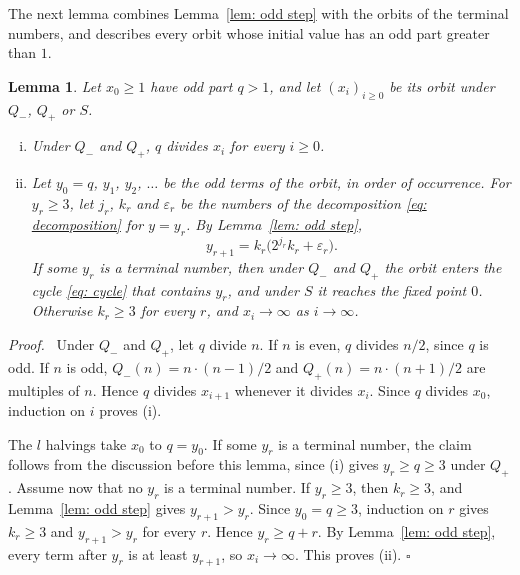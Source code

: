 \documentclass{article}
\newtheorem{lemma}{Lemma}
\newenvironment{proof}[1][Proof]{\par\medskip\noindent\textit{#1.}\ }{\hfill$\square$\par\medskip}
\newcommand{\Ge}{\geqslant}
\begin{document}
The next lemma combines Lemma~\ref{lem: odd step} with the orbits of the terminal numbers, and describes every orbit whose initial value has an odd part greater than $1$.

\begin{lemma}
\label{lem: orbit}
    Let $x_0 \Ge 1$ have odd part $q > 1$, and let $(x_i)_{i \Ge 0}$ be its orbit under $Q_-$, $Q_+$ or $S$.
    \begin{enumerate}[(i)]
        \setlength{\itemsep}{0pt}
        \item Under $Q_-$ and $Q_+$, $q$ divides $x_i$ for every $i \Ge 0$.
        \item Let $y_0 = q$, $y_1$, $y_2$, $\dots$ be the odd terms of the orbit, in order of occurrence. For $y_r \Ge 3$, let $j_r$, $k_r$ and $\varepsilon_r$ be the numbers of the decomposition \eqref{eq: decomposition} for $y = y_r$. By Lemma~\ref{lem: odd step},
        \begin{equation}
            y_{r+1} = k_r \bigl( 2^{j_r} k_r + \varepsilon_r \bigr) .
            \label{eq: odd terms}
        \end{equation}
        If some $y_r$ is a terminal number, then under $Q_-$ and $Q_+$ the orbit enters the cycle \eqref{eq: cycle} that contains $y_r$, and under $S$ it reaches the fixed point $0$. Otherwise $k_r \Ge 3$ for every $r$, and $x_i \to \infty$ as $i \to \infty$.
    \end{enumerate}
\end{lemma}

\begin{proof}
    Under $Q_-$ and $Q_+$, let $q$ divide $n$. If $n$ is even, $q$ divides $n/2$, since $q$ is odd. If $n$ is odd, $Q_-(n) = n \cdot (n - 1)/2$ and $Q_+(n) = n \cdot (n + 1)/2$ are multiples of $n$. Hence $q$ divides $x_{i+1}$ whenever it divides $x_i$. Since $q$ divides $x_0$, induction on $i$ proves (i).

    The $l$ halvings take $x_0$ to $q = y_0$. If some $y_r$ is a terminal number, the claim follows from the discussion before this lemma, since (i) gives $y_r \Ge q \Ge 3$ under $Q_+$. Assume now that no $y_r$ is a terminal number. If $y_r \Ge 3$, then $k_r \Ge 3$, and Lemma~\ref{lem: odd step} gives $y_{r+1} > y_r$. Since $y_0 = q \Ge 3$, induction on $r$ gives $k_r \Ge 3$ and $y_{r+1} > y_r$ for every $r$. Hence $y_r \Ge q + r$. By Lemma~\ref{lem: odd step}, every term after $y_r$ is at least $y_{r+1}$, so $x_i \to \infty$. This proves (ii).
\end{proof}
\end{document}
